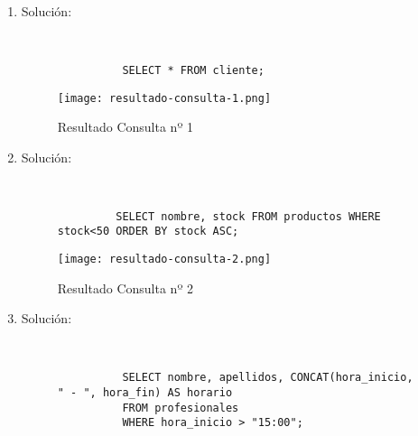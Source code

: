 \begin{enumerate}
    \item Solución:

    \begin{figure}[h]
        \begin{tcolorbox}[sharp corners, colback=yellow!30, colframe=white!20]
            \scriptsize
            \begin{verbatim}


          SELECT * FROM cliente;  \end{verbatim}
        \end{tcolorbox}
    \end{figure}

    \begin{figure}[H]
        \centering
        \texttt{[image: resultado-consulta-1.png]}
        \caption{Resultado Consulta nº 1}
    \end{figure}

    \item Solución:

    \begin{figure}[h]
        \begin{tcolorbox}[sharp corners, colback=yellow!30, colframe=white!20]
            \scriptsize
            \begin{verbatim}


         SELECT nombre, stock FROM productos WHERE stock<50 ORDER BY stock ASC;
            \end{verbatim}
        \end{tcolorbox}
    \end{figure}

    \begin{figure}[H]
        \centering
        \texttt{[image: resultado-consulta-2.png]}
        \caption{Resultado Consulta nº 2}
    \end{figure}

    \item Solución:

      \begin{figure}[H]
        \begin{tcolorbox}[sharp corners, colback=yellow!30, colframe=white!20]
            \scriptsize
            \begin{verbatim}


          SELECT nombre, apellidos, CONCAT(hora_inicio, " - ", hora_fin) AS horario
          FROM profesionales
          WHERE hora_inicio > "15:00";
            \end{verbatim}
        \end{tcolorbox}
    \end{figure}


\end{enumerate}
